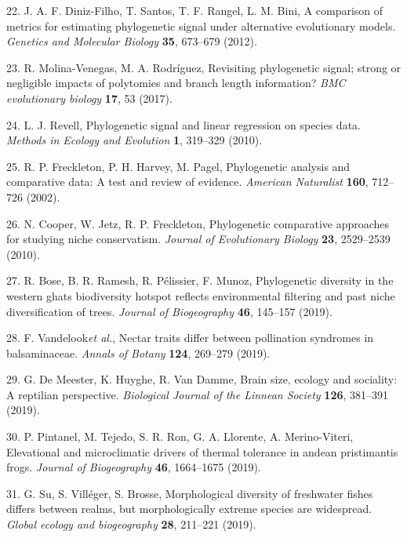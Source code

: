 \documentclass[]{article}
\begin{document}
\leavevmode\hypertarget{ref-DinizFilho2012}{}%
22. J. A. F. Diniz-Filho, T. Santos, T. F. Rangel, L. M. Bini, A
comparison of metrics for estimating phylogenetic signal under
alternative evolutionary models. \emph{Genetics and Molecular Biology}
\textbf{35}, 673--679 (2012).

\leavevmode\hypertarget{ref-MolinaVenegas2017}{}%
23. R. Molina-Venegas, M. A. Rodríguez, Revisiting phylogenetic signal;
strong or negligible impacts of polytomies and branch length
information? \emph{BMC evolutionary biology} \textbf{17}, 53 (2017).

\leavevmode\hypertarget{ref-Revell2010}{}%
24. L. J. Revell, Phylogenetic signal and linear regression on species
data. \emph{Methods in Ecology and Evolution} \textbf{1}, 319--329
(2010).

\leavevmode\hypertarget{ref-Freckleton_et_al2002}{}%
25. R. P. Freckleton, P. H. Harvey, M. Pagel, Phylogenetic analysis and
comparative data: A test and review of evidence. \emph{American
Naturalist} \textbf{160}, 712--726 (2002).

\leavevmode\hypertarget{ref-Cooper2010}{}%
26. N. Cooper, W. Jetz, R. P. Freckleton, Phylogenetic comparative
approaches for studying niche conservatism. \emph{Journal of
Evolutionary Biology} \textbf{23}, 2529--2539 (2010).

\leavevmode\hypertarget{ref-Bose2019}{}%
27. R. Bose, B. R. Ramesh, R. Pélissier, F. Munoz, Phylogenetic
diversity in the western ghats biodiversity hotspot reflects
environmental filtering and past niche diversification of trees.
\emph{Journal of Biogeography} \textbf{46}, 145--157 (2019).

\leavevmode\hypertarget{ref-Vandelook2019}{}%
28. F. Vandelook\emph{et al.}, Nectar traits differ between pollination
syndromes in balsaminaceae. \emph{Annals of Botany} \textbf{124},
269--279 (2019).

\leavevmode\hypertarget{ref-DeMeester2019}{}%
29. G. De Meester, K. Huyghe, R. Van Damme, Brain size, ecology and
sociality: A reptilian perspective. \emph{Biological Journal of the
Linnean Society} \textbf{126}, 381--391 (2019).

\leavevmode\hypertarget{ref-Pintanel2019}{}%
30. P. Pintanel, M. Tejedo, S. R. Ron, G. A. Llorente, A. Merino-Viteri,
Elevational and microclimatic drivers of thermal tolerance in andean
pristimantis frogs. \emph{Journal of Biogeography} \textbf{46},
1664--1675 (2019).

\leavevmode\hypertarget{ref-Su2019}{}%
31. G. Su, S. Villéger, S. Brosse, Morphological diversity of freshwater
fishes differs between realms, but morphologically extreme species are
widespread. \emph{Global ecology and biogeography} \textbf{28}, 211--221
(2019).
\end{document}
